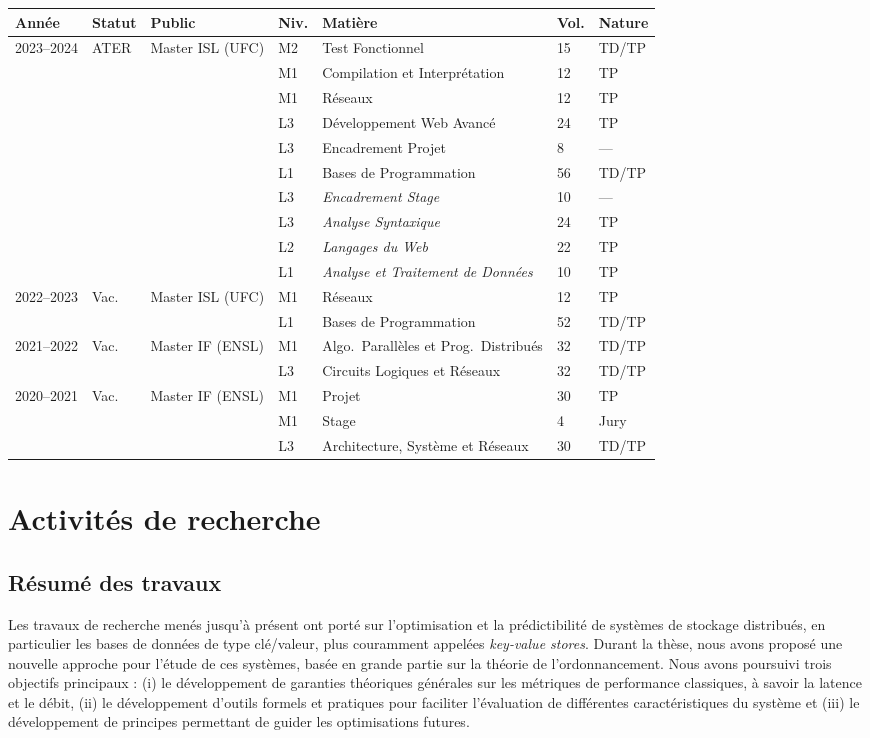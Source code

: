 \documentclass[12pt]{article}
\begin{document}
\begin{center}
    \footnotesize
    \begin{tabularx}{\linewidth}{p{2cm}lp{3cm}lXll}
        \toprule
        Année & Statut & Public & Niv. & Matière & Vol. & Nature \tabularnewline
        \midrule
        2023--2024 & ATER & Master ISL (UFC) & M2 & Test Fonctionnel & 15 & TD/TP \tabularnewline
        & & & M1 & Compilation et Interprétation & 12 & TP \tabularnewline
        & & & M1 & Réseaux & 12 & TP \tabularnewline
        & & & L3 & Développement Web Avancé & 24 & TP \tabularnewline
        & & & L3 & Encadrement Projet & 8 & --- \tabularnewline
        & & & L1 & Bases de Programmation & 56 & TD/TP \tabularnewline
        \cmidrule{4-7}
        & & & L3 & \emph{Encadrement Stage} & 10 & --- \tabularnewline
        & & & L3 & \emph{Analyse Syntaxique} & 24 & TP \tabularnewline
        & & & L2 & \emph{Langages du Web} & 22 & TP \tabularnewline
        & & & L1 & \emph{Analyse et Traitement de Données} & 10 & TP \tabularnewline
        \midrule
        2022--2023 & Vac. & Master ISL (UFC) & M1 & Réseaux & 12 & TP \tabularnewline
        & & & L1 & Bases de Programmation & 52 & TD/TP \tabularnewline
        \midrule
        2021--2022 & Vac. & Master IF (ENSL) & M1 & Algo.\ Parallèles et Prog.\ Distribués & 32 & TD/TP \tabularnewline
        & & & L3 & Circuits Logiques et Réseaux & 32 & TD/TP \tabularnewline
        \midrule
        2020--2021 & Vac. & Master IF (ENSL) & M1 & Projet & 30 & TP \tabularnewline
        & & & M1 & Stage & 4 & Jury \tabularnewline
        & & & L3 & Architecture, Système et Réseaux & 30 & TD/TP \tabularnewline
        \bottomrule
    \end{tabularx}
\end{center}

\section{Activités de recherche}

\subsection{Résumé des travaux}

Les travaux de recherche menés jusqu'à présent ont porté sur l'optimisation et la prédictibilité de
systèmes de stockage distribués, en particulier les bases de données de type clé/valeur, plus
couramment appelées \emph{key-value stores}.  
Durant la thèse, nous avons proposé une nouvelle approche pour l'étude de ces systèmes, basée en
grande partie sur la théorie de l'ordonnancement.  
Nous avons poursuivi trois objectifs principaux : (i) le développement de garanties théoriques
générales sur les métriques de performance classiques, à savoir la latence et le débit, (ii) le
développement d'outils formels et pratiques pour faciliter l'évaluation de différentes
caractéristiques du système et (iii) le développement de principes permettant de guider les
optimisations futures.
\end{document}
